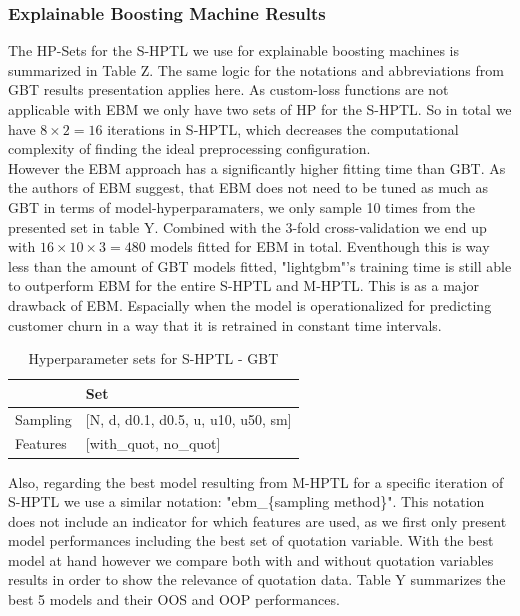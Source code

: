 \documentclass[12pt,titlepage]{article}
\begin{document}
\subsubsection*{Explainable Boosting Machine Results}

The HP-Sets for the S-HPTL we use for explainable boosting machines is summarized in Table Z. The same logic for the notations and abbreviations from GBT results presentation applies here. As custom-loss functions are not applicable with EBM we only have two sets of HP for the S-HPTL. So in total we have $8\times2=16$ iterations in S-HPTL, which decreases the computational complexity of finding the ideal preprocessing configuration. \\
However the EBM approach has a significantly higher fitting time than GBT. As the authors of EBM suggest, that EBM does not need to be tuned as much as GBT in terms of model-hyperparamaters, we only sample 10 times from the presented set in table Y. Combined with the 3-fold cross-validation we end up with $16\times10\times3=480$ models fitted for EBM in total. Eventhough this is way less than the amount of GBT models fitted, "lightgbm"'s training time is still able to outperform EBM for the entire S-HPTL and M-HPTL. This is as a major drawback of EBM. Espacially when the model is operationalized for predicting customer churn in a way that it is retrained in constant time intervals.\\

\begin{table}
    \centering
    \caption{Hyperparameter sets for S-HPTL - GBT}
    \begin{tabular}{|l|l|}
    \hline
              & Set  \\
    \hline
    Sampling &  [N, d, d0.1, d0.5, u, u10, u50, sm]  \\
    Features & [with\_quot, no\_quot] \\
    \hline
    \end{tabular}
\end{table}

Also, regarding the best model resulting from M-HPTL for a specific iteration of S-HPTL we use a similar notation: "ebm\_\{sampling method\}". This notation does not include an indicator for which features are used, as we first only present model performances including the best set of quotation variable. With the best model at hand however we compare both with and without quotation variables results in order to show the relevance of quotation data. Table Y summarizes the best 5 models and their OOS and OOP performances.\\
\end{document}

